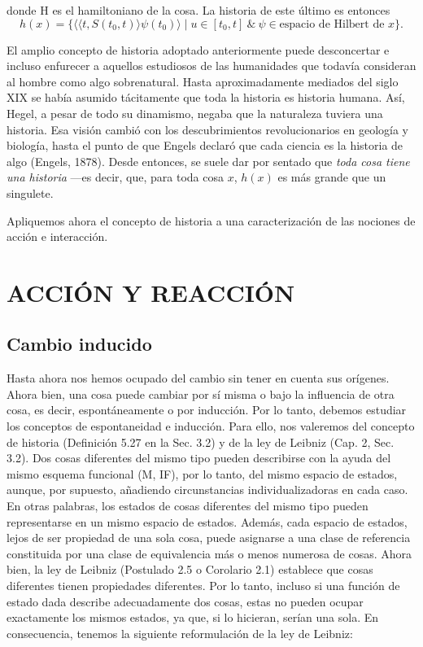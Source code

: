 \begin{justifying}
    \newpage

    \noindent donde H es el hamiltoniano de la cosa. La historia de este último es entonces
    \[
        h(x) = \{\langle \langle t, S(t_0, t) \rangle \psi(t_0) \rangle \mid u \in [t_0, t] \ \& \ \psi \in \text{espacio de Hilbert de } x\}.
    \]

    El amplio concepto de historia adoptado anteriormente puede desconcertar e 
    incluso enfurecer a aquellos estudiosos de las humanidades que todavía 
    consideran al hombre como algo sobrenatural. Hasta aproximadamente mediados 
    del siglo XIX se había asumido tácitamente que toda la historia es historia 
    humana. Así, Hegel, a pesar de todo su dinamismo, negaba que la naturaleza 
    tuviera una historia. Esa visión cambió con los descubrimientos revolucionarios 
    en geología y biología, hasta el punto de que Engels declaró que cada ciencia 
    es la historia de algo (Engels, 1878). Desde entonces, se suele dar por sentado 
    que \textit{toda cosa tiene una historia} ---es decir, que, para toda cosa $x$, 
    $h(x)$ es más grande que un singulete.

    Apliquemos ahora el concepto de historia a una caracterización de las nociones 
    de acción e interacción.

    \bigskip

    \section{\centering ACCIÓN Y REACCIÓN}

    \subsection{Cambio inducido}
    Hasta ahora nos hemos ocupado del cambio sin tener en cuenta sus
    orígenes. Ahora bien, una cosa puede cambiar por sí misma o bajo la influencia
    de otra cosa, es decir, espontáneamente o por inducción. Por lo tanto, debemos
    estudiar los conceptos de espontaneidad e inducción. Para ello,
    nos valeremos del concepto de historia (Definición 5.27 en la Sec.
    3.2) y de la ley de Leibniz (Cap. 2, Sec. 3.2).
    Dos cosas diferentes del mismo tipo pueden describirse con la ayuda
    del mismo esquema funcional (M, IF), por lo tanto, del mismo espacio de estados,
    aunque, por supuesto, añadiendo circunstancias individualizadoras en cada caso. En
    otras palabras, los estados de cosas diferentes del mismo tipo pueden representarse en
    un mismo espacio de estados. Además, cada espacio de estados, lejos de ser
    propiedad de una sola cosa, puede asignarse a una clase de referencia constituida por
    una clase de equivalencia más o menos numerosa de cosas. Ahora bien, la ley de Leibniz
    (Postulado 2.5 o Corolario 2.1) establece que cosas diferentes tienen propiedades diferentes.
    Por lo tanto, incluso si una función de estado dada describe adecuadamente
    dos cosas, estas no pueden ocupar exactamente los mismos estados, ya que, si lo hicieran,
    serían una sola. En consecuencia, tenemos la siguiente reformulación de
    la ley de Leibniz: 


\end{justifying}
